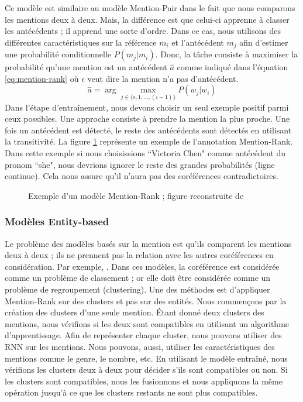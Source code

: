 \documentclass{KodeBook}
\begin{document}
Ce modèle est similaire au modèle Mention-Pair dans le fait que nous comparons les mentions deux à deux. 
Mais, la différence est que celui-ci apprenne à classer les antécédents ; il apprend une sorte d'ordre. 
Dans ce cas, nous utilisons des différentes caractéristiques sur la référence $m_i$ et l'antécédent $m_j$ afin d'estimer une probabilité conditionnelle $P(m_j|m_i)$.
Donc, la tâche consiste à maximiser la probabilité qu'une mention est un antécédent $\hat{a}$ comme indiqué dans l'équation \ref{eq:mention-rank} où $\epsilon$ veut dire la mention n'a pas d'antécédent. 
\begin{equation}\label{eq:mention-rank}
\hat{a} = \arg\max_{j \in \{\epsilon, 1, \ldots, (i-1)\}} P(w_j|w_i) 
\end{equation}
Dans l'étape d'entraînement, nous devons choisir un seul exemple positif parmi ceux possibles. 
Une approche consiste à prendre la mention la plus proche.
Une fois un antécédent est détecté, le reste des antécédents sont détectés en utilisant la transitivité. 
La figure \ref{fig:mention-rank-exp} représente un exemple de l'annotation Mention-Rank.
Dans cette exemple si nous choisissions ``Victoria Chen" comme antécédent du pronom ``she", nous devrions ignorer le reste des grandes probabilités (ligne continue).
Cela nous assure qu'il n'aura pas des coréférences contradictoires.
\begin{figure}[ht]
	\centering
	\caption[Exemple d'un modèle Mention-Rank]{Exemple d'un modèle Mention-Rank ; figure reconstruite de \cite{2019-jurafsky-martin}}
	\label{fig:mention-rank-exp}
\end{figure}



\subsubsection{Modèles Entity-based}

Le problème des modèles basés sur la mention est qu'ils comparent les mentions deux à deux ; ils ne prennent pas la relation avec les autres coréférences en considération.
Par exemple, .
Dans ces modèles, la coréférence est considérée comme un problème de classement ; or elle doit être considérée comme un problème de regroupement (clustering). 
Une des méthodes est d'appliquer Mention-Rank sur des clusters et pas sur des entités. 
Nous commençons par la création des clusters d'une seule mention. 
Étant donné deux clusters des mentions, nous vérifions si les deux sont compatibles en utilisant un algorithme d'apprentissage.
Afin de représenter chaque cluster, nous pouvons utiliser des RNN sur les mentions.
Nous pouvons, aussi, utiliser les caractéristiques des mentions comme le genre, le nombre, etc.
En utilisant le modèle entraîné, nous vérifions les clusters deux à deux pour décider s'ils sont compatibles ou non.
Si les clusters sont compatibles, nous les fusionnons et nous appliquons la même opération jusqu'à ce que les clusters restants ne sont plus compatibles.
\end{document}
